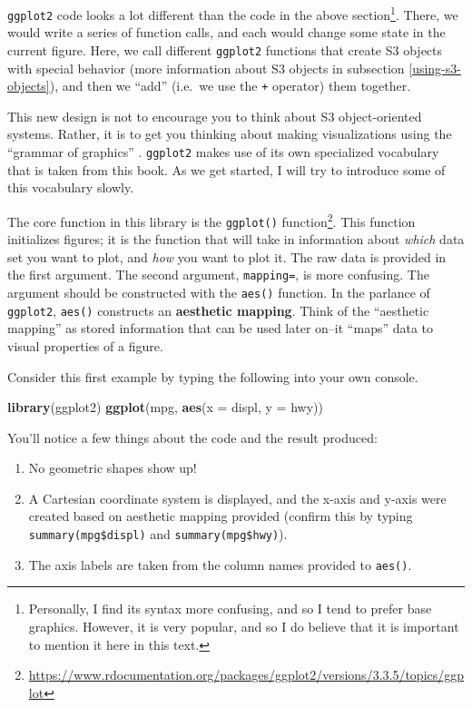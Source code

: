 \documentclass[12pt,krantz2]{krantz}
\makeatletter
\newenvironment{Shaded}{\begin{snugshade}}{\end{snugshade}}
\newcommand{\DataTypeTok}[1]{\textcolor[rgb]{0.27,0.27,0.27}{#1}}
\newcommand{\KeywordTok}[1]{\textcolor[rgb]{0.27,0.27,0.27}{\textbf{#1}}}
\newcommand{\NormalTok}[1]{#1}
\renewcommand{\href}[2]{#2\footnote{\url{#1}}}
\newenvironment{kframe}{%
\medskip{}
\setlength{\fboxsep}{.8em}
 \def\at@end@of@kframe{}%
 \ifinner\ifhmode%
  \def\at@end@of@kframe{\end{minipage}}%
  \begin{minipage}{\columnwidth}%
 \fi\fi%
 \def\FrameCommand##1{\hskip\@totalleftmargin \hskip-\fboxsep
 \colorbox{shadecolor}{##1}\hskip-\fboxsep
     \hskip-\linewidth \hskip-\@totalleftmargin \hskip\columnwidth}%
 \MakeFramed {\advance\hsize-\width
   \@totalleftmargin\z@ \linewidth\hsize
   \@setminipage}}%
 {\par\unskip\endMakeFramed%
 \at@end@of@kframe}
\renewenvironment{Shaded}{\begin{kframe}}{\end{kframe}}
\makeatother
\begin{document}
\texttt{ggplot2} code looks a lot different than the code in the above section\footnote{Personally, I find its syntax more confusing, and so I tend to prefer base graphics. However, it is very popular, and so I do believe that it is important to mention it here in this text.}. There, we would write a series of function calls, and each would change some state in the current figure. Here, we call different \texttt{ggplot2} functions that create S3 objects with special behavior (more information about S3 objects in subsection \ref{using-s3-objects}), and then we ``add'' (i.e.~we use the \texttt{+} operator) them together.

This new design is not to encourage you to think about S3 object-oriented systems. Rather, it is to get you thinking about making visualizations using the ``grammar of graphics'' \citep{gog}. \texttt{ggplot2} makes use of its own specialized vocabulary that is taken from this book. As we get started, I will try to introduce some of this vocabulary slowly.

The core function in this library is the \href{https://www.rdocumentation.org/packages/ggplot2/versions/3.3.5/topics/ggplot}{\texttt{ggplot()} function}. This function initializes figures; it is the function that will take in information about \emph{which} data set you want to plot, and \emph{how} you want to plot it. The raw data is provided in the first argument. The second argument, \texttt{mapping=}, is more confusing. The argument should be constructed with the \texttt{aes()} function. In the parlance of \texttt{ggplot2}, \texttt{aes()} constructs an \textbf{aesthetic mapping}. Think of the ``aesthetic mapping'' as stored information that can be used later on--it ``maps'' data to visual properties of a figure.

Consider this first example by typing the following into your own console.

\begin{Shaded}
\begin{Highlighting}[]
\KeywordTok{library}\NormalTok{(ggplot2)}
\KeywordTok{ggplot}\NormalTok{(mpg, }\KeywordTok{aes}\NormalTok{(}\DataTypeTok{x =}\NormalTok{ displ, }\DataTypeTok{y =}\NormalTok{ hwy))}
\end{Highlighting}
\end{Shaded}

You'll notice a few things about the code and the result produced:

\begin{enumerate}
\def\labelenumi{\arabic{enumi}.}
\item
  No geometric shapes show up!
\item
  A Cartesian coordinate system is displayed, and the x-axis and y-axis were created based on aesthetic mapping provided (confirm this by typing \texttt{summary(mpg\$displ)} and \texttt{summary(mpg\$hwy)}).
\item
  The axis labels are taken from the column names provided to \texttt{aes()}.
\end{enumerate}
\end{document}
